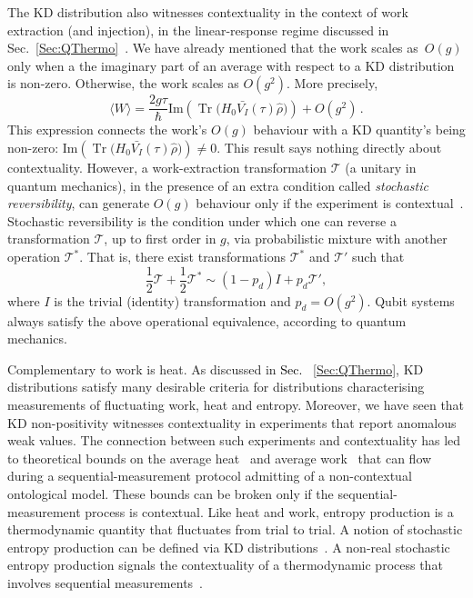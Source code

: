 \documentclass[%
 reprint,
superscriptaddress,
nofootinbib,
bibnotes,
 amsmath,amssymb,
 aps,
]{revtex4-1}
\theoremstyle{plain}
\DeclareMathOperator{\Tr}{Tr}
\newcommand{\nicole}[1]{\textcolor{black}{#1} }
\begin{document}
The KD distribution also witnesses contextuality in the context of work extraction (and injection), in the linear-response regime discussed in Sec.~\ref{Sec:QThermo}~\cite{Lostaglio_certifying_2020}. We have already mentioned that the work scales as~$O(g)$ only when a the imaginary part of 
an average with respect to a KD distribution
is non-zero. Otherwise, the work scales as $O(g^2)$. More precisely,
\begin{equation}
    \langle W \rangle = \frac{2 g \tau }{\hbar} \mathrm{Im}\left( \Tr\bm{(}H_0 \bar{V_I}(\tau) \hat{\rho} \bm{)}\right) + O\left(g^2\right)\,.
\end{equation}
This expression connects the work's $O(g)$ behaviour with a KD quantity's  being non-zero: $\mathrm{Im}\left(  \Tr\bm{(}H_0 \bar{V_I}(\tau) \hat{\rho} \bm{)}\right) \neq 0$.
This result says nothing directly about contextuality. However, a work-extraction transformation ${\mathscr{T}}$ (a unitary in quantum mechanics), in the presence of an extra condition called \emph{stochastic reversibility}, can generate $O(g)$ behaviour only if the experiment is  contextual~\cite{Lostaglio_certifying_2020}. Stochastic reversibility is the condition under which one can reverse a transformation ${\mathscr{T}}$, up to first order in $g$, via probabilistic mixture with another operation ${\mathscr{T}}^*$. That is, there exist transformations ${\mathscr{T}}^*$ and ${\mathscr{T}}'$ such that
\begin{equation}
    \frac{1}{2}{\mathscr{T}} + \frac{1}{2}{\mathscr{T}}^* \sim (1-p_d) I + p_d {\mathscr{T}}',
\end{equation}
where $I$ is the trivial (identity) transformation and $p_d=O(g^2)$.
Qubit systems always satisfy the above operational equivalence, according to quantum mechanics.






Complementary to work is heat.
As discussed in 
\nicole{Sec.}~\ref{Sec:QThermo}, KD distributions 
satisfy many desirable criteria for distributions characterising measurements of fluctuating work, heat and entropy. Moreover, we have seen that KD non-positivity witnesses contextuality in experiments that 
report anomalous weak values. The connection between such experiments and contextuality has led to theoretical bounds on the average heat~\cite{Levy_quasiprobability_2020} and average work~\cite{Hernandez-Gomez_projective_2022} that can flow during a sequential-measurement protocol admitting of a non-contextual ontological model. These bounds can be broken only if the sequential-measurement process is contextual.
Like heat and work, entropy production is a thermodynamic quantity that fluctuates from trial to trial. A notion of stochastic entropy production can be defined via KD distributions~\cite{Upadhyaya_what_2023}. A non-real stochastic entropy production signals the contextuality of a 
thermodynamic process that involves sequential measurements~\cite{Upadhyaya_what_2023}.
\end{document}
